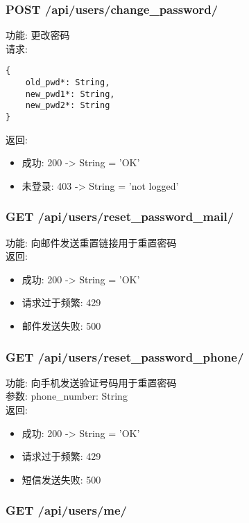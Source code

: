 \begin{enumerate}
\subsubsection{POST /api/users/change\_password/}

\noindent
功能: 更改密码\\
请求: 
\begin{lstlisting}[numbers=none, frame=none]
{
    old_pwd*: String,
    new_pwd1*: String,
    new_pwd2*: String
}
\end{lstlisting}
返回:
\begin{itemize}
	\item 成功:  200 -> String = 'OK'
	\item 未登录:  403 -> String = 'not logged'
\end{itemize}

\subsubsection{GET /api/users/reset\_password\_mail/}

\noindent
功能: 向邮件发送重置链接用于重置密码\\
返回:
\begin{itemize}
	\item 成功:  200 -> String = 'OK'
	\item 请求过于频繁:  429
	\item 邮件发送失败:  500
\end{itemize}


\subsubsection{GET /api/users/reset\_password\_phone/}

\noindent
功能: 向手机发送验证号码用于重置密码\\
参数: phone\_number: String\\
返回:
\begin{itemize}
\item 成功:  200 -> String = 'OK'
\item 请求过于频繁:  429
\item 短信发送失败:  500
\end{itemize}



\subsubsection{GET /api/users/me/}


\end{enumerate}
